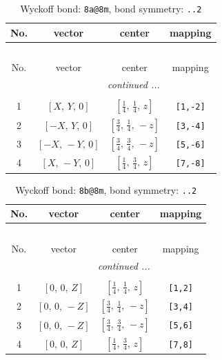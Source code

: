 \documentclass[fleqn,8pt]{jsarticle}
\begin{document}
\begin{longtable}{cccc}
\caption{Wyckoff bond: {\tt 8a@8m}, bond symmetry: {\tt ..2}}
 \\
 \hline \hline
No. & vector & center & mapping \\ \hline \endfirsthead

\multicolumn{3}{l}{\tablename\ \thetable{}} \\
 \hline \hline
No. & vector & center & mapping \\ \hline \endhead

 \hline \hline
\multicolumn{3}{r}{\footnotesize\it continued ...} \\ \endfoot

 \hline \hline
\multicolumn{3}{r}{} \\ \endlastfoot

1 & $\left[ X,\, Y,\, 0 \right]$ & $\left[ \frac{1}{4},\, \frac{1}{4},\, z \right]$ & {\tt [1,-2]} \\ \hline
2 & $\left[ - X,\, Y,\, 0 \right]$ & $\left[ \frac{3}{4},\, \frac{1}{4},\, - z \right]$ & {\tt [3,-4]} \\ \hline
3 & $\left[ - X,\, - Y,\, 0 \right]$ & $\left[ \frac{3}{4},\, \frac{3}{4},\, - z \right]$ & {\tt [5,-6]} \\ \hline
4 & $\left[ X,\, - Y,\, 0 \right]$ & $\left[ \frac{1}{4},\, \frac{3}{4},\, z \right]$ & {\tt [7,-8]} \\
\end{longtable}
\renewcommand{\arraystretch}{1.2}
\begin{longtable}{cccc}
\caption{Wyckoff bond: {\tt 8b@8m}, bond symmetry: {\tt ..2}}
 \\
 \hline \hline
No. & vector & center & mapping \\ \hline \endfirsthead

\multicolumn{3}{l}{\tablename\ \thetable{}} \\
 \hline \hline
No. & vector & center & mapping \\ \hline \endhead

 \hline \hline
\multicolumn{3}{r}{\footnotesize\it continued ...} \\ \endfoot

 \hline \hline
\multicolumn{3}{r}{} \\ \endlastfoot

1 & $\left[ 0,\, 0,\, Z \right]$ & $\left[ \frac{1}{4},\, \frac{1}{4},\, z \right]$ & {\tt [1,2]} \\ \hline
2 & $\left[ 0,\, 0,\, - Z \right]$ & $\left[ \frac{3}{4},\, \frac{1}{4},\, - z \right]$ & {\tt [3,4]} \\ \hline
3 & $\left[ 0,\, 0,\, - Z \right]$ & $\left[ \frac{3}{4},\, \frac{3}{4},\, - z \right]$ & {\tt [5,6]} \\ \hline
4 & $\left[ 0,\, 0,\, Z \right]$ & $\left[ \frac{1}{4},\, \frac{3}{4},\, z \right]$ & {\tt [7,8]} \\
\end{longtable}
\end{document}
